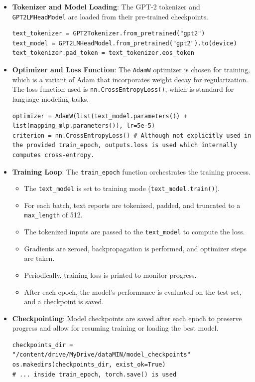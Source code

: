 \documentclass[a4paper, 12pt]{article}
\begin{document}
\begin{itemize}
\begin{itemize}
    \item \textbf{Tokenizer and Model Loading}: The GPT-2 tokenizer and \texttt{GPT2LMHeadModel} are loaded from their pre-trained checkpoints.
    \begin{lstlisting}[breaklines=true]
text_tokenizer = GPT2Tokenizer.from_pretrained("gpt2")
text_model = GPT2LMHeadModel.from_pretrained("gpt2").to(device)
text_tokenizer.pad_token = text_tokenizer.eos_token
    \end{lstlisting}
    \item \textbf{Optimizer and Loss Function}: The \texttt{AdamW} optimizer is chosen for training, which is a variant of Adam that incorporates weight decay for regularization. The loss function used is \texttt{nn.CrossEntropyLoss()}, which is standard for language modeling tasks.
    \begin{lstlisting}[breaklines=true]
optimizer = AdamW(list(text_model.parameters()) + list(mapping_mlp.parameters()), lr=5e-5)
criterion = nn.CrossEntropyLoss() # Although not explicitly used in the provided train_epoch, outputs.loss is used which internally computes cross-entropy.
    \end{lstlisting}
    \item \textbf{Training Loop}: The \texttt{train\_epoch} function orchestrates the training process.
    \begin{itemize}
        \item The \texttt{text\_model} is set to training mode (\texttt{text\_model.train()}).
        \item For each batch, text reports are tokenized, padded, and truncated to a \texttt{max\_length} of 512.
        \item The tokenized inputs are passed to the \texttt{text\_model} to compute the loss.
        \item Gradients are zeroed, backpropagation is performed, and optimizer steps are taken.
        \item Periodically, training loss is printed to monitor progress.
        \item After each epoch, the model's performance is evaluated on the test set, and a checkpoint is saved.
    \end{itemize}
    \item \textbf{Checkpointing}: Model checkpoints are saved after each epoch to preserve progress and allow for resuming training or loading the best model.
    \begin{lstlisting}[breaklines=true]
checkpoints_dir = "/content/drive/MyDrive/dataMIN/model_checkpoints"
os.makedirs(checkpoints_dir, exist_ok=True)
# ... inside train_epoch, torch.save() is used
    \end{lstlisting}
\end{itemize}


\end{itemize}
\end{document}
